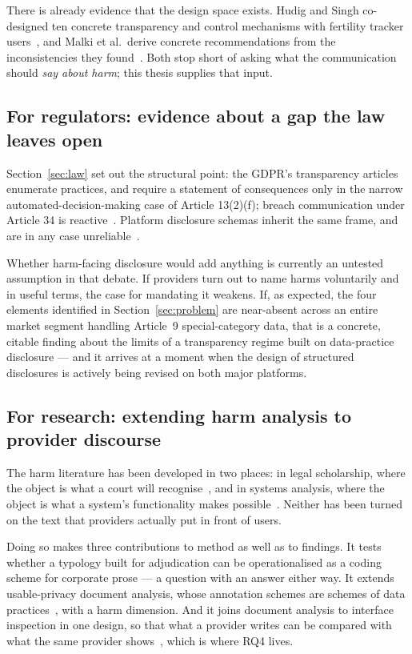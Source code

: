 There is already evidence that the design space exists. Hudig and Singh
co-designed ten concrete transparency and control mechanisms with fertility
tracker users~\parencite{hudig2025intimate}, and Malki et al.\ derive concrete
recommendations from the inconsistencies they
found~\parencite{malki2024exploring}. Both stop short of asking what the
communication should \emph{say about harm}; this thesis supplies that input.

\subsection{For regulators: evidence about a gap the law leaves open}

Section~\ref{sec:law} set out the structural point: the GDPR's
transparency articles enumerate practices, and require a statement of
consequences only in the narrow automated-decision-making case of Article
13(2)(f); breach communication under Article 34 is
reactive~\parencite{gdpr2016}. Platform disclosure schemas inherit the same
frame, and are in any case unreliable~\parencite{arkalakis2024abandon,li2022ios}.

Whether harm-facing disclosure would add anything is currently an untested
assumption in that debate. If providers turn out to name harms voluntarily and
in useful terms, the case for mandating it weakens. If, as expected, the four
elements identified in Section~\ref{sec:problem} are near-absent across an
entire market segment handling Article~9 special-category data, that is a
concrete, citable finding about the limits of a transparency regime built on
data-practice disclosure --- and it arrives at a moment when the design of
structured disclosures is actively being revised on both major platforms.

\subsection{For research: extending harm analysis to provider discourse}

The harm literature has been developed in two places: in legal scholarship,
where the object is what a court will
recognise~\parencite{citron2021harms,calo2011boundaries,solove2006taxonomy}, and
in systems analysis, where the object is what a system's functionality makes
possible~\parencite{knabenhans2026harms}. Neither has been turned on the text
that providers actually put in front of users.

Doing so makes three contributions to method as well as to findings. It tests
whether a typology built for adjudication can be operationalised as a coding
scheme for corporate prose --- a question with an answer either way. It extends
usable-privacy document analysis, whose annotation schemes are schemes of data
practices~\parencite{wilson2016creation,harkous2018polisis}, with a harm
dimension. And it joins document analysis to interface inspection in one design,
so that what a provider writes can be compared with what the same provider
shows~\parencite{wharton1994cognitive}, which is where RQ4 lives.
